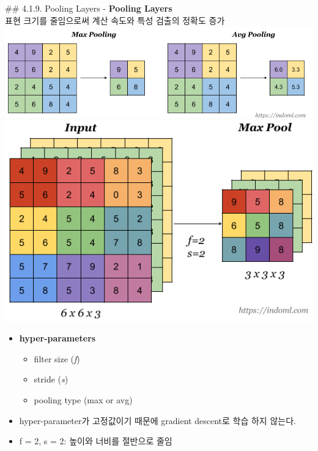 \documentclass[11pt]{article}
\makeatletter
\def\maxwidth{\ifdim\Gin@nat@width>\linewidth\linewidth
    \else\Gin@nat@width\fi}
\let\Oldincludegraphics\includegraphics
\renewcommand{\includegraphics}[1]{\Oldincludegraphics[width=.8\maxwidth]{#1}}
\providecommand{\tightlist}{%
      \setlength{\itemsep}{0pt}\setlength{\parskip}{0pt}}
\makeatother
\begin{document}
     \#\# 4.1.9. Pooling Layers - \textbf{Pooling Layers}\\
표현 크기를 줄임으로써 계산 속도와 특성 검출의 정확도 증가\\
 \includegraphics{./Images/c4week1/17.png} \\
 \includegraphics{./Images/c4week1/17-2.png}

\begin{itemize}
\tightlist
\item
  \textbf{hyper-parameters}

  \begin{itemize}
  \tightlist
  \item
    filter size (\emph{f})
  \item
    stride (\emph{s})
  \item
    pooling type (max or avg)
  \end{itemize}
\item
  hyper-parameter가 고정값이기 때문에 gradient descent로 학습 하지
  않는다.
\item
  f = 2, s = 2: 높이와 너비를 절반으로 줄임
\end{itemize}
\end{document}
